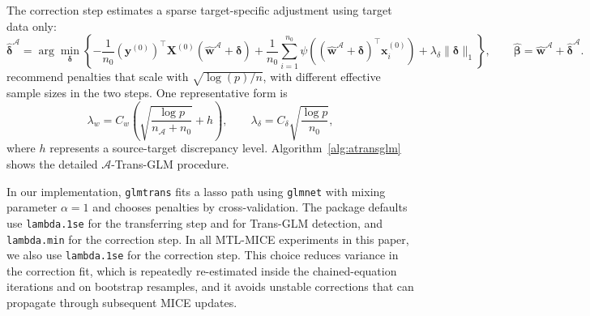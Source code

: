 \documentclass[12pt]{article}
\begin{document}
The correction step estimates a sparse target-specific adjustment using target data only:
\[
\hat{\bm{\delta}}^{\mathcal{A}}
=\arg\min_{\bm{\delta}}
\left\{
-\frac{1}{n_0}(\bm{y}^{(0)})^\top \bm{X}^{(0)}(\hat{\bm{w}}^{\mathcal{A}}+\bm{\delta})
+\frac{1}{n_0}\sum_{i=1}^{n_0}\psi\!\left((\hat{\bm{w}}^{\mathcal{A}}+\bm{\delta})^\top \bm{x}^{(0)}_i\right)
+\lambda_\delta\|\bm{\delta}\|_1
\right\},
\qquad
\hat{\bm{\beta}}=\hat{\bm{w}}^{\mathcal{A}}+\hat{\bm{\delta}}^{\mathcal{A}}.
\]
\citet{tian_transfer_2022} recommend penalties that scale with $\sqrt{\log(p)/n}$, with different effective sample sizes in the two steps.
One representative form is
\[
\lambda_w=C_w\left(\sqrt{\frac{\log p}{n_{\mathcal{A}}+n_0}}+h\right),\qquad
\lambda_\delta=C_\delta\sqrt{\frac{\log p}{n_0}},
\]
where $h$ represents a source-target discrepancy level. Algorithm~\ref{alg:atransglm} shows the detailed $\mathcal{A}$-Trans-GLM procedure.

In our implementation, \texttt{glmtrans} fits a lasso path using \texttt{glmnet} with mixing parameter $\alpha=1$ and chooses penalties by
cross-validation. The package defaults use \texttt{lambda.1se} for the transferring step and for Trans-GLM detection, and \texttt{lambda.min}
for the correction step. In all MTL-MICE experiments in this paper, we also use \texttt{lambda.1se} for the correction step. This choice
reduces variance in the correction fit, which is repeatedly re-estimated inside the chained-equation iterations and on bootstrap resamples,
and it avoids unstable corrections that can propagate through subsequent MICE updates.
\end{document}
